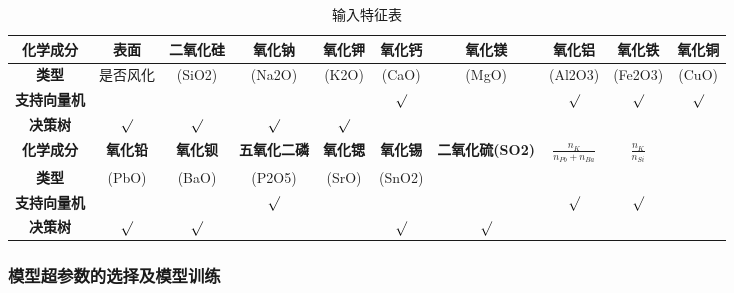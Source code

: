 \documentclass[withoutpreface,bwprint]{cumcmthesis} %
\begin{document}
\begin{table}[!h]
	\centering
	\footnotesize
	\caption{输入特征表}
	\label{6-1}
	\begin{tabular}{@{}cccccccccc@{}}
		\toprule
		\textbf{化学成分}  & \textbf{表面}  & \textbf{二氧化硅} & \textbf{氧化钠}   & \textbf{氧化钾} & \textbf{氧化钙} & \textbf{氧化镁}       & \textbf{氧化铝}                         & \textbf{氧化铁}                    & \textbf{氧化铜} \\ \midrule
		\textbf{类型}    & 是否风化         & (SiO2)        & (Na2O)         & (K2O)        & (CaO)        & (MgO)              & (Al2O3)                              & (Fe2O3)                         & (CuO)        \\
		\textbf{支持向量机} &              &               &                &              & $\surd$      &                    & $\surd$                              & $\surd$                         & $\surd$      \\
		\textbf{决策树}   & $\surd$      & $\surd$       & $\surd$        & $\surd$      &              &                    &                                      &                                 &              \\ \midrule
		\textbf{化学成分}  & \textbf{氧化铅} & \textbf{氧化钡}  & \textbf{五氧化二磷} & \textbf{氧化锶} & \textbf{氧化锡} & \textbf{二氧化硫(SO2)} & \textbf{$\frac{n_K}{n_{Pb}+n_{Ba}}$} & \textbf{$\frac{n_{K}}{n_{Si}}$} & \textbf{}    \\ \midrule
		\textbf{类型}    & (PbO)        & (BaO)         & (P2O5)         & (SrO)        & (SnO2)       &                    &                                      &                                 &              \\
		\textbf{支持向量机} &              &               & $\surd$        &              &              &                    & $\surd$                              & $\surd$                         &              \\
		\textbf{决策树}   & $\surd$      & $\surd$       &                &              & $\surd$      & $\surd$            &                                      &                                 &              \\ \bottomrule
	\end{tabular}
\end{table}

\subsubsection{模型超参数的选择及模型训练}
\end{document}
